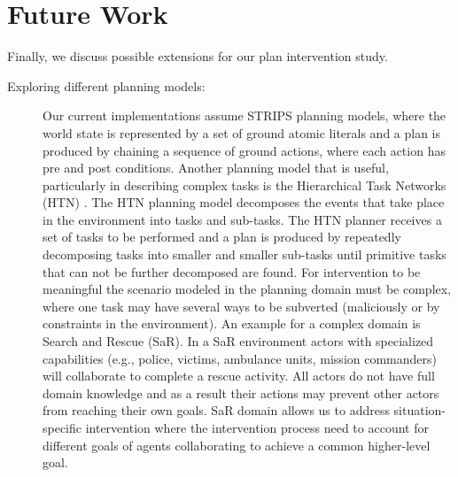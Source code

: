 \section{Future Work}
Finally, we discuss possible extensions for our plan intervention study.

\begin{description}
\item[Exploring different planning models:]
Our current implementations assume STRIPS planning models, where
the world state is represented by a set of ground atomic literals and a plan is produced by chaining a sequence of ground actions, where each action has pre and post conditions.
Another planning model that is useful, particularly in describing complex tasks is the Hierarchical Task Networks (HTN) \cite{erol1995htn}.
The HTN planning model decomposes the events that take place in the environment into tasks and sub-tasks.
The HTN planner receives a set of tasks to be performed and a plan is produced by repeatedly decomposing tasks into smaller and smaller sub-tasks until primitive tasks that can not be further decomposed are found.
For intervention to be meaningful the scenario modeled in the planning domain must be complex, where one task may have several ways to be subverted (maliciously or by constraints in the environment).
An example for a complex domain is Search and Rescue (SaR).
In a SaR environment actors with specialized capabilities (e.g., police, victims, ambulance units, mission commanders) will collaborate to complete a rescue activity. 
All actors do not have full domain knowledge and as a result their actions may prevent other actors from reaching their own goals. 
SaR domain allows us to address situation-specific intervention where the intervention process need to account for different goals of agents collaborating to achieve a common higher-level goal.


\end{description}
